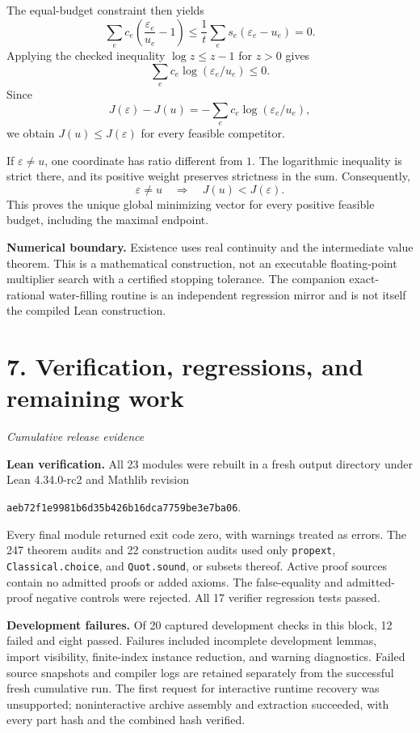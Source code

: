 \documentclass[11pt]{article}
\newcommand{\code}[1]{\texttt{\small #1}}
\newcommand{\pageheading}[2]{\section*{\color{ink}#1}\textit{#2}\par}
\begin{document}
The equal-budget constraint then yields
\[
\sum_e c_e\left(\frac{\varepsilon_e}{u_e}-1\right)
\le\frac1t\sum_e s_e(\varepsilon_e-u_e)=0.
\]
Applying the checked inequality $\log z\le z-1$ for $z>0$ gives
\[
\sum_e c_e\log(\varepsilon_e/u_e)\le0.
\]
Since
\[
J(\varepsilon)-J(u)
=-\sum_e c_e\log(\varepsilon_e/u_e),
\]
we obtain $J(u)\le J(\varepsilon)$ for every feasible competitor.

If $\varepsilon\ne u$, one coordinate has ratio different from $1$. The logarithmic inequality is strict there, and its positive weight preserves strictness in the sum. Consequently,
\[
\boxed{\varepsilon\ne u\quad\Longrightarrow\quad J(u)<J(\varepsilon).}
\]
This proves the unique global minimizing vector for every positive feasible budget, including the maximal endpoint.

\textbf{Numerical boundary.} Existence uses real continuity and the intermediate value theorem. This is a mathematical construction, not an executable floating-point multiplier search with a certified stopping tolerance. The companion exact-rational water-filling routine is an independent regression mirror and is not itself the compiled Lean construction.

\newpage
\pageheading{7. Verification, regressions, and remaining work}{Cumulative release evidence}
\textbf{Lean verification.} All 23 modules were rebuilt in a fresh output directory under Lean 4.34.0-rc2 and Mathlib revision
\begin{center}\code{aeb72f1e9981b6d35b426b16dca7759be3e7ba06}.\end{center}
Every final module returned exit code zero, with warnings treated as errors. The 247 theorem audits and 22 construction audits used only \code{propext}, \code{Classical.choice}, and \code{Quot.sound}, or subsets thereof. Active proof sources contain no admitted proofs or added axioms. The false-equality and admitted-proof negative controls were rejected. All 17 verifier regression tests passed.

\textbf{Development failures.} Of 20 captured development checks in this block, 12 failed and eight passed. Failures included incomplete development lemmas, import visibility, finite-index instance reduction, and warning diagnostics. Failed source snapshots and compiler logs are retained separately from the successful fresh cumulative run. The first request for interactive runtime recovery was unsupported; noninteractive archive assembly and extraction succeeded, with every part hash and the combined hash verified.
\end{document}
